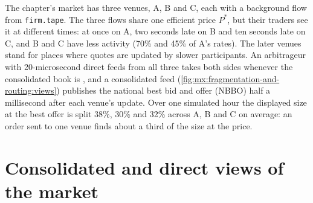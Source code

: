 The chapter's market has three venues, A, B and C, each with a background flow from \texttt{firm.tape}. The three flows share one efficient price $P^\ast$,
but their traders see it at different times: at once on A, two seconds late on B and ten seconds late on C, and B and C have less activity (70\% and 45\%
of A's rates). The later venues stand for places where quotes are updated by slower participants. An arbitrageur with 20-microsecond direct feeds from
all three takes both sides whenever the consolidated book is , and a consolidated feed (\cref{fig:mx:fragmentation-and-routing:views}) publishes
the national best bid and offer (NBBO) half a millisecond after each venue's update. Over one simulated hour the displayed size at the best offer is split
38\%, 30\% and 32\% across A, B and C on average: an order sent to one venue finds about a third of the size at the price.

\begin{omfigure}

\label{fig:mx:fragmentation-and-routing:views}
\end{omfigure}

\section{Consolidated and direct views of the market}

